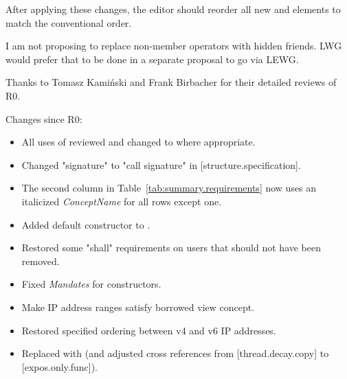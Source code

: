 After applying these changes, the editor should reorder all new
\constraints and \mandates elements to match the conventional order.

\vspace{1.5cm}

I am not proposing to replace non-member operators with hidden friends.
LWG would prefer that to be done in a separate proposal to go via LEWG.

Thanks to Tomasz Kamiński and Frank Birbacher for their detailed reviews of R0.

Changes since R0:
\begin{itemize}
\item All uses of  reviewed and changed to
   where appropriate.
\item Changed "signature" to "call signature" in [structure.specification].
\item The second column in Table~\ref{tab:summary.requirements} now uses
  an italicized \textit{ConceptName} for all rows except one.
\item Added  default constructor to .
\item Restored some "shall" requirements on users that should not have been removed.
\item Fixed \textit{Mandates} for  constructors.
\item Make IP address ranges satisfy borrowed view concept.
\item Restored specified ordering between v4 and v6 IP addresses.
\item Replaced  with 
  (and adjusted cross references from [thread.decay.copy] to [expos.only.func]).
\end{itemize}


\newpage


{}
\hypertarget{toctarget}{\tableofcontents*}

\setcounter{tocdepth}{5}

%
